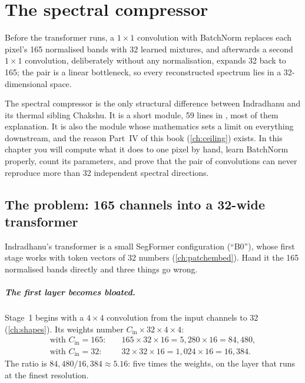 \chapter{The spectral compressor}\label{ch:compressor}

\begin{onething}
Before the transformer runs, a $1\times1$ convolution with BatchNorm replaces each pixel's 165
normalised bands with 32 learned mixtures, and afterwards a second $1\times1$ convolution, deliberately
without any normalisation, expands 32 back to 165; the pair is a linear bottleneck, so every
reconstructed spectrum lies in a 32-dimensional space.
\end{onething}

The spectral compressor is the only structural difference between Indradhanu and its thermal sibling
Chakshu. It is a short module, 59 lines in
, most of them explanation. It is also
the module whose mathematics sets a limit on everything downstream, and the reason Part~IV of this book
(\cref{ch:ceiling}) exists. In this chapter you will compute what it does to one pixel by hand, learn
BatchNorm properly, count its parameters, and prove that the pair of convolutions can never reproduce
more than 32 independent spectral directions.

\section{The problem: 165 channels into a 32-wide transformer}\label{sec:compressor:problem}

Indradhanu's transformer is a small SegFormer configuration (``B0''), whose first stage works with
token vectors of 32 numbers (\cref{ch:patchembed}). Hand it the 165 normalised bands directly and
three things go wrong.

\paragraph{The first layer becomes bloated.} Stage~1 begins with a $4\times4$ convolution from the input
channels to 32 (\cref{ch:shapes}). Its weights number $C_{\text{in}}\times32\times4\times4$:
\begin{align*}
\text{with } C_{\text{in}} = 165:&\quad 165\times32\times16 = 5{,}280\times16 = 84{,}480,\\
\text{with } C_{\text{in}} = 32:&\quad 32\times32\times16 = 1{,}024\times16 = 16{,}384.
\end{align*}
The ratio is $84{,}480/16{,}384 \approx 5.16$: five times the weights, on the layer that runs at the
finest resolution.

